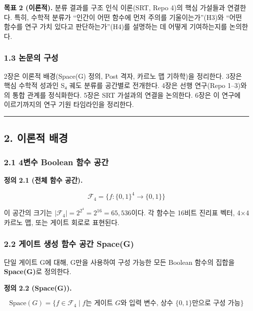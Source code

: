 \documentclass[
]{article}
\begin{document}
\textbf{목표 2 (이론적).} 분류 결과를 구조 인식 이론(SRT, Repo 4)의 핵심
가설들과 연결한다. 특히, 수학적 분류가 ``인간이 어떤 함수에 먼저 주의를
기울이는가''(H3)와 ``어떤 함수를 연구 가치 있다고 판단하는가''(H4)를
설명하는 데 어떻게 기여하는지를 논의한다.

\subsubsection{1.3 논문의 구성}\label{uxb17cuxbb38uxc758-uxad6cuxc131}

2장은 이론적 배경(Space(G) 정의, Post 격자, 카르노 맵 기하학)을
정리한다. 3장은 핵심 수학적 성과인 S₄ 궤도 분류를 공간별로 전개한다.
4장은 선행 연구(Repo 1--3)와의 통합 관계를 정식화한다. 5장은 SRT
가설과의 연결을 논의한다. 6장은 이 연구에 이르기까지의 연구 기원
타임라인을 정리한다.

\begin{center}\rule{0.5\linewidth}{0.5pt}\end{center}

\subsection{2. 이론적 배경}\label{uxc774uxb860uxc801-uxbc30uxacbd}

\subsubsection{2.1 4변수 Boolean 함수
공간}\label{uxbcc0uxc218-boolean-uxd568uxc218-uxacf5uxac04}

\textbf{정의 2.1 (전체 함수 공간).}

\[\mathcal{F}_4 = \{ f : \{0,1\}^4 \to \{0,1\} \}\]

이 공간의 크기는 \(|\mathcal{F}_4| = 2^{2^4} = 2^{16} = 65{,}536\)이다.
각 함수는 16비트 진리표 벡터, 4×4 카르노 맵, 또는 게이트 회로로
표현된다.

\subsubsection{2.2 게이트 생성 함수 공간
Space(G)}\label{uxac8cuxc774uxd2b8-uxc0dduxc131-uxd568uxc218-uxacf5uxac04-spaceg}

단일 게이트 G에 대해, G만을 사용하여 구성 가능한 모든 Boolean 함수의
집합을 \textbf{Space(G)}로 정의한다.

\textbf{정의 2.2 (Space(G)).}

\[\text{Space}(G) = \{ f \in \mathcal{F}_4 \mid f\text{는 게이트 }G\text{와 입력 변수, 상수 }\{0,1\}\text{만으로 구성 가능} \}\]
\end{document}
